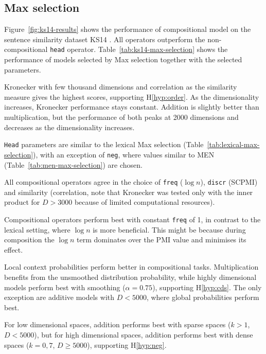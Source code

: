 \subsection{Max selection}
\label{sec:max-selection-ks14}



Figure~\ref{fig:ks14-results} shows the performance of compositional model on the sentence similarity dataset KS14 \cite{kartsadrqpl2014}. All operators outperform the non-compositional \texttt{head} operator. Table~\ref{tab:ks14-max-selection} shows the performance of models selected by Max selection together with the selected parameters.

Kronecker with few thousand dimensions and correlation as the similarity measure gives the highest scores, supporting H\ref{hyp:order}. As the dimensionality increases, Kronecker performance stays constant. Addition is slightly better than multiplication, but the performance of both peaks at 2000 dimensions and decreases as the dimensionality increases.

\texttt{Head} parameters are similar to the lexical Max selection (Table~\ref{tab:lexical-max-selection}), with an exception of \texttt{neg}, where values similar to MEN (Table~\ref{tab:men-max-selection}) are chosen.

All compositional operators agree in the choice of \texttt{freq} ($\log n$), \texttt{discr} (SCPMI) and similarity (correlation, note that Kronecker was tested only with the inner product for $D > 3000$ because of limited computational resources).

Compositional operators perform best with constant \texttt{freq} of 1, in contrast to the lexical setting, where $\log n$ is more beneficial. This might be because during composition the $\log n$ term dominates over the PMI value and minimises its effect.

Local context probabilities perform better in compositional tasks. Multiplication benefits from the unsmoothed distribution probability, while highly dimensional models perform best with smoothing ($\alpha = 0.75$), supporting H\ref{hyp:cds}. The only exception are additive models with $D < 5000$, where global probabilities perform best.

For low dimensional spaces, addition performs best with sparse spaces ($k > 1$, $D < 5000$), but for high dimensional spaces, addition performs best  with dense spaces ($k = 0,7$, $D \geq 5000$), supporting H\ref{hyp:neg}.

